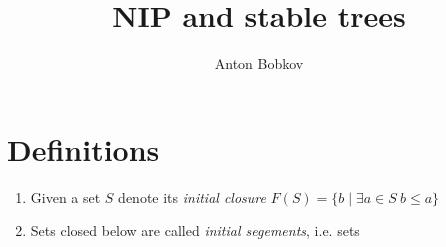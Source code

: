 \documentclass{amsart}
\begin{document}
\title{NIP and stable trees}
\author{Anton Bobkov}

\maketitle

\section{Definitions}

\begin{Definition}
	\begin{enumerate}
		\item Given a set $S$ denote its \emph{initial closure} $F(S) = \{b \mid \exists a \in S \ b \leq a\}$
		\item Sets closed below are called \emph{initial segements}, i.e. sets
	\end{enumerate}
\end{Definition}
\end{document}
